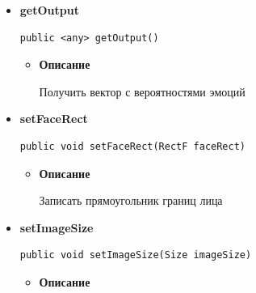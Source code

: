 \documentclass[a4paper,12pt]{article}
\begin{document}
{{{{{\begin{itemize}
{\begin{itemize}
{                                                Получить название эмоции
                                            }
                                        \end{itemize}
                                    }%
                                    \item{
                                        {\bf  getOutput}\\
                                        \begin{lstlisting}[frame=none]
public <any> getOutput()\end{lstlisting} %
                                        \begin{itemize}
                                            \item{
                                                    {\bf  Описание}

                                                Получить вектор с вероятностями эмоций
                                            }
                                        \end{itemize}
                                    }%
                                    \item{
                                        {\bf  setFaceRect}\\
                                        \begin{lstlisting}[frame=none]
public void setFaceRect(RectF faceRect)\end{lstlisting} %
                                        \begin{itemize}
                                            \item{
                                                    {\bf  Описание}

                                                Записать прямоугольник границ лица
                                            }
                                        \end{itemize}
                                    }%
                                    \item{
                                        {\bf  setImageSize}\\
                                        \begin{lstlisting}[frame=none]
public void setImageSize(Size imageSize)\end{lstlisting} %
                                        \begin{itemize}
                                            \item{
                                                    {\bf  Описание}

}
\end{itemize}}
\end{itemize}}}}}}
\end{document}
